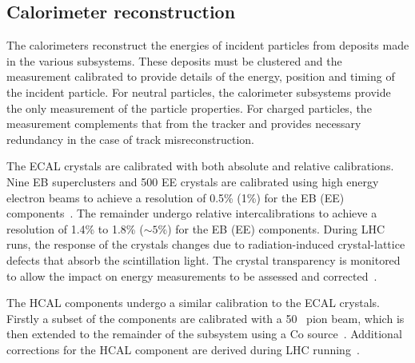 \subsection{Calorimeter reconstruction}

The calorimeters reconstruct the energies of incident particles from deposits made in the 
various subsystems. These deposits must be clustered and the measurement calibrated to provide 
details of the energy, position and timing of the incident particle.
For neutral particles, the calorimeter subsystems provide the only measurement of
the particle properties. For charged particles, the measurement complements that
from the tracker and provides necessary redundancy in the case of track
misreconstruction.

The ECAL crystals are calibrated with both absolute and relative calibrations. Nine EB superclusters
and 500 EE crystals are calibrated using high energy electron beams to achieve a 
resolution of 0.5\% (1\%) for the EB (EE) components~\cite{ecal_calib}. 
The remainder undergo relative intercalibrations to achieve a resolution of 1.4\% to 1.8\% ($\sim5\%$) 
for the EB (EE) components. During LHC runs, the response of the crystals changes due to 
radiation-induced crystal-lattice defects that absorb the scintillation light. 
The crystal transparency is monitored to allow the impact on energy measurements to
be assessed and corrected~\cite{ecal_calib}. 

The HCAL components undergo a similar calibration to the ECAL crystals. Firstly a subset of the 
components are calibrated with a 50 \GeV~pion beam, which is then extended to the remainder of the 
subsystem using a Co source~\cite{hcal_beam}. Additional corrections
for the HCAL component are derived during LHC running~\cite{hcal_calib}.

%

